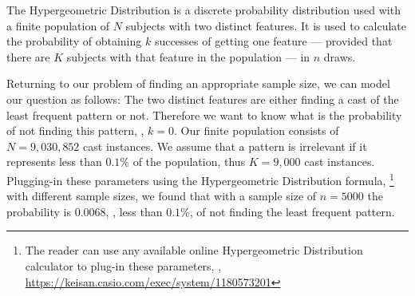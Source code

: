 The Hypergeometric Distribution is a discrete probability distribution used with a finite population of $N$ subjects
with two distinct features.
It is used to calculate the probability of obtaining $k$ successes of getting one feature --- provided that there are $K$ subjects with that feature in the population --- in $n$ draws.

Returning to our problem of finding an appropriate sample size, we can model our question as follows:
The two distinct features are either finding a cast of the least frequent pattern or not.
Therefore we want to know what is the probability of not finding this pattern, \ie, $k = 0$.
Our finite population consists of $N = 9,030,852$ cast instances.
%
%
We assume that a pattern is irrelevant if it represents less than $0.1\%$ of the population, thus $K = 9,000$ cast instances.
Plugging-in these parameters using the Hypergeometric Distribution formula,%
\footnote{The reader can use any available online Hypergeometric Distribution calculator to plug-in these parameters, \eg, \url{https://keisan.casio.com/exec/system/1180573201}}
with different sample sizes,
we found that with a sample size of $n = 5000$ the probability is $0.0068$,
\ie, less than $0.1 \%$, of not finding the least frequent pattern.







